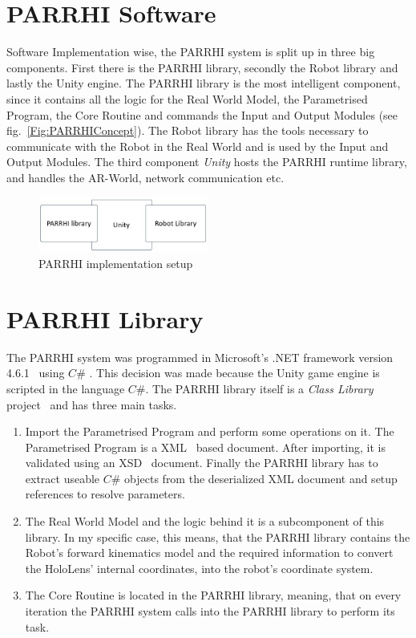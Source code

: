 \section{PARRHI Software}\label{Section:PARRHIHardware}
Software Implementation wise, the PARRHI system is split up in three big components. First there is the PARRHI library, secondly the Robot library and lastly the Unity engine. The PARRHI library is the most intelligent component, since it contains all the logic for the Real World Model, the Parametrised Program, the Core Routine and commands the Input and Output Modules (see fig.~\ref{Fig:PARRHIConcept}). The Robot library has the tools necessary to communicate with the Robot in the Real World and is used by the Input and Output Modules. The third component \textit{Unity} hosts the PARRHI runtime library, and handles the AR-World, network communication etc.


\begin{figure}[!h]
	\centering
	\includegraphics[width=0.5\textwidth]{Figures/Implementation_SystemSetup.jpg}
	\caption{PARRHI implementation setup}
	\label{Fig:Implementation}
\end{figure}


\section{PARRHI Library}
The PARRHI system was programmed in Microsoft's .NET framework version 4.6.1~\cite{NETFramework} using $C\#$ \cite{CSharp}. This decision was made because the Unity game engine is scripted in the language $C\#$. The PARRHI library itself is a \textit{Class Library} project~\cite{ClassLibrary} and has three main tasks.

\begin{enumerate}
	\item Import the Parametrised Program and perform some operations on it. The Parametrised Program is a XML~\cite{xmlW3C} based document. After importing, it is validated using an XSD~\cite{xsdW3C} document. Finally the PARRHI library has to extract useable $C\#$ objects from the deserialized XML document and setup references to resolve parameters.
	\item The Real World Model and the logic behind it is a subcomponent of this library. In my specific case, this means, that the PARRHI library contains the Robot's forward kinematics model and the required information to convert the HoloLens' internal coordinates, into the robot's coordinate system.
	\item The Core Routine is located in the PARRHI library, meaning, that on every iteration the PARRHI system calls into the PARRHI library to perform its task.
\end{enumerate}

